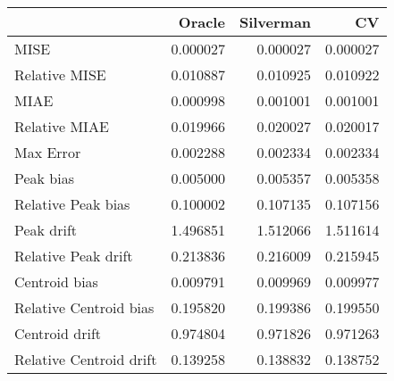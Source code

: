 \begin{tabular}{lrrr}
  \hline
 & Oracle & Silverman & CV \\ 
  \hline
MISE & 0.000027 & 0.000027 & 0.000027 \\ 
  Relative MISE & 0.010887 & 0.010925 & 0.010922 \\ 
  MIAE & 0.000998 & 0.001001 & 0.001001 \\ 
  Relative MIAE & 0.019966 & 0.020027 & 0.020017 \\ 
  Max Error & 0.002288 & 0.002334 & 0.002334 \\ 
  Peak bias & 0.005000 & 0.005357 & 0.005358 \\ 
  Relative Peak bias & 0.100002 & 0.107135 & 0.107156 \\ 
  Peak drift & 1.496851 & 1.512066 & 1.511614 \\ 
  Relative Peak drift & 0.213836 & 0.216009 & 0.215945 \\ 
  Centroid bias & 0.009791 & 0.009969 & 0.009977 \\ 
  Relative Centroid bias & 0.195820 & 0.199386 & 0.199550 \\ 
  Centroid drift & 0.974804 & 0.971826 & 0.971263 \\ 
  Relative Centroid drift & 0.139258 & 0.138832 & 0.138752 \\ 
   \hline
\end{tabular}
